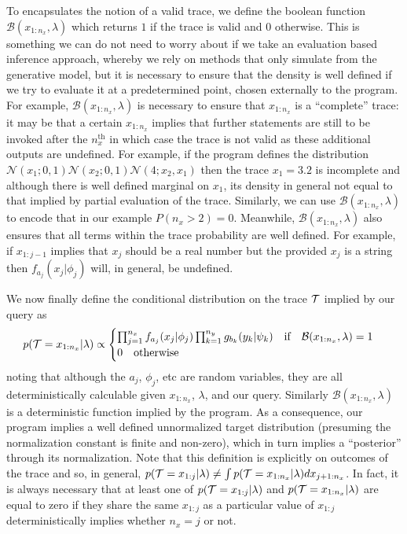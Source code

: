 To encapsulates the notion of a valid trace, we define the boolean function $\mathcal{B}(x_{1:n_x},\lambda)$
which returns $1$ if the trace is valid and $0$ otherwise.   This is something we can do not need
to worry about if we take an evaluation based inference approach, whereby
we rely on methods that only simulate from the generative model, but it is necessary to ensure that the density
is well defined if we try to evaluate it at a predetermined point, chosen externally to the program.
For example, $\mathcal{B}(x_{1:n_x},\lambda)$ is necessary to
ensure that $x_{1:n_x}$ is a ``complete'' trace: it may be that a certain $x_{1:n_x}$
implies that further \sample statements are still to be invoked after the $n_x^{\text{th}}$ in which case the
trace is not valid as these additional outputs are undefined.  For example, if the program defines the distribution
$\mathcal{N}(x_1;0,1)\mathcal{N}(x_2;0,1)\mathcal{N}(4;x_2,x_1)$ then the trace $x_1=3.2$ is incomplete
and although there is well defined marginal on $x_1$, its density in general not equal to that implied by
partial evaluation of the trace.  
Similarly, we can use  $\mathcal{B}(x_{1:n_x},\lambda)$ to encode that in our example $P(n_x>2)=0$.  Meanwhile,
$\mathcal{B}(x_{1:n_x},\lambda)$ also ensures that  all terms within the
trace probability are well defined.  For example, if $x_{1:j-1}$ implies that $x_j$ should be a real number but the provided
$x_j$ is a string then $f_{a_j} (x_j | \phi_j)$ will, in general, be undefined. 

We now finally define the conditional distribution on the trace $\mathcal{T}$
implied by our query as
\begin{align}
\label{eq:probprog:universal-cond}
p(\mathcal{T} = x_{1:n_x} | \lambda)
\propto \begin{cases}
\prod_{j=1}^{n_x} 
f_{a_j}(x_j | \phi_j)
\prod_{k=1}^{n_y}
g_{b_k}(y_k | \psi_k) \quad \text{if} \quad \mathcal{B}(x_{1:n_x},\lambda)=1 \\
0 \quad \text{otherwise}
\end{cases}
\end{align}
noting that although the $a_j$, $\phi_j$, etc are random variables, they are all deterministically
calculable given $x_{1:n_x}$, $\lambda$, and our query.  Similarly $\mathcal{B}(x_{1:n_x},\lambda)$
is a deterministic function implied by the program. As a consequence, our program implies a well
defined unnormalized target distribution (presuming the normalization constant is finite and non-zero),
which in turn implies a ``posterior'' through its normalization.  Note that this definition is
explicitly on outcomes of the trace and so, in general, $p(\mathcal{T} = x_{1:j} | \lambda) \neq
\int p(\mathcal{T} = x_{1:n_x} | \lambda) dx_{j+1:n_x}$.  In fact, it is always necessary that at least one of
$p(\mathcal{T} = x_{1:j} | \lambda)$ and $p(\mathcal{T} = x_{1:n_x} | \lambda)$ are equal to zero if they share the
same $x_{1:j}$ as a particular value
of $x_{1:j}$ deterministically implies whether $n_x=j$ or not.

